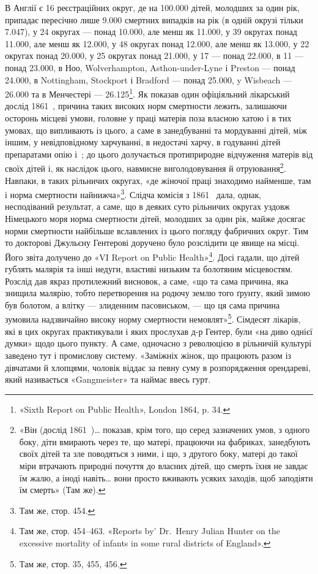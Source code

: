 \parcont{}  %
В Англії є 16 реєстраційних округ, де на \num{100.000} дітей, молодших
за один рік, припадає пересічно лише \num{9.000} смертних випадків
на рік (в одній окрузі тільки \num{7.047}), у 24 округах — понад \num{10.000},
але менш як \num{11.000}, у 39 округах понад \num{11.000}, але менш як \num{12.000},
у 48 округах понад \num{12.000}, але менш як \num{13.000}, у 22 округах
понад \num{20.000}, у 25 округах понад \num{21.000}, у 17 — понад \num{22.000},
в 11 — понад \num{23.000}, в Ноо, Wolverhampton, Asthon-under-Lyne
і Preston — понад \num{24.000}, в Nottingham, Stockport і Bradford —
понад \num{25.000}, y Wisbeach — \num{26.000} та в Менчестері — \num{26.125}\footnote{
«Sixth Report on Public Health», London 1864, p. 34.
}.
Як показав один офіціяльний лікарський дослід 1861~, причина
таких високих норм смертности лежить, залишаючи осторонь
місцеві умови, головне у праці матерів поза власною хатою і в
тих умовах, що випливають із цього, а саме в занедбуванні та
мордуванні дітей, між іншим, у невідповідному харчуванні, в
недостачі харчу, в годуванні дітей препаратами опію і~;
до цього долучається протиприродне відчуження матерів від
своїх дітей і, як наслідок цього, навмисне виголодовування й
отруювання\footnote{
«Він (дослід 1861~)\dots{} показав, крім того, що серед зазначених
умов, з одного боку, діти вмирають через те, що матері, працюючи на фабриках,
занедбують своїх дітей та зле поводяться з ними, і що, з другого
боку, матері до такої міри втрачають природні почуття до власних
дітей, що смерть їхня не завдає їм жалю, а іноді навіть\dots{} вони просто вживають
усяких заходів, щоб заподіяти їм смерть» (Там же).
}. Навпаки, в таких рільничих округах, «де жіночої
праці знаходимо найменше, там і норма смертности найнижча»\footnote{
Там же, стор. 454.
}.
Слідча комісія з 1861~ дала, однак, несподіваний результат,
а саме, що в деяких суто рільничих округах уздовж Німецького
моря норма смертности дітей, молодших за один рік, майже
досягає норми смертности найбільше вславлених із цього погляду
фабричних округ. Тим то докторові Джульєну Гентерові доручено
було розслідити це явище на місці. Його звіта долучено до
«VI Report on Public Health»\footnote{
Там же, стор. 454--463. «Reports by' Dr.~Henry Julian Hunter
on the excessive mortality of infants in some rural districts of England».
}. Досі гадали, що дітей гублять малярія
та інші недуги, властиві низьким та болотяним місцевостям.
Розслід дав якраз протилежний висновок, а саме, «що та сама
причина, яка знищила малярію, тобто перетворення на родючу
землю того ґрунту, який зимою був болотом, а влітку — злиденним
пасовиськом, — що ця сама причина зумовила надзвичайно
високу норму смертности немовлят»\footnote{
Там же, стор. 35, 455, 456.
}. Сімдесят лікарів, які
в цих округах практикували і яких прослухав д-р Гентер,
були «на диво однієї думки» щодо цього пункту. А саме, одночасно
з революцією в рільничій культурі заведено тут і промислову
систему. «Заміжніх жінок, що працюють разом із дівчатами й
хлопцями, чоловік віддає за певну суму в розпорядження орендареві,
який називається «Gangmeister» та наймає ввесь гурт.
\parbreak{}  %
